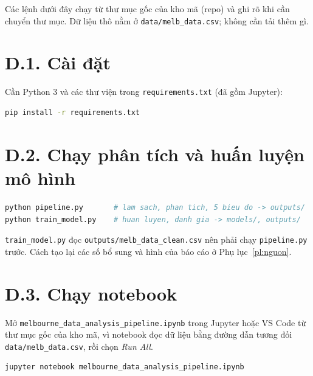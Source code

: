 Các lệnh dưới đây chạy từ thư mục gốc của kho mã (repo) và ghi rõ khi cần chuyển thư mục. Dữ liệu thô nằm ở \texttt{data/melb\_data.csv}; không cần tải thêm gì.

\section*{D.1. Cài đặt}
Cần Python 3 và các thư viện trong \texttt{requirements.txt} (đã gồm Jupyter):
\begin{lstlisting}[language=bash]
pip install -r requirements.txt
\end{lstlisting}

\section*{D.2. Chạy phân tích và huấn luyện mô hình}
\begin{lstlisting}[language=bash]
python pipeline.py       # lam sach, phan tich, 5 bieu do -> outputs/
python train_model.py    # huan luyen, danh gia -> models/, outputs/
\end{lstlisting}
\texttt{train\_model.py} đọc \texttt{outputs/melb\_data\_clean.csv} nên phải chạy \texttt{pipeline.py} trước. Cách tạo lại các số bổ sung và hình của báo cáo ở Phụ lục~\ref{pl:nguon}.

\section*{D.3. Chạy notebook}
Mở \texttt{melbourne\_\allowbreak data\_\allowbreak analysis\_\allowbreak pipeline.ipynb} trong Jupyter hoặc VS Code từ thư mục gốc của kho mã, vì notebook đọc dữ liệu bằng đường dẫn tương đối \texttt{data/melb\_data.csv}, rồi chọn \emph{Run All}.
\begin{lstlisting}[language=bash]
jupyter notebook melbourne_data_analysis_pipeline.ipynb
\end{lstlisting}
